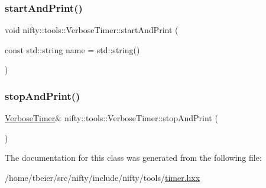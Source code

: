 \subsubsection{\texorpdfstring{start\+And\+Print()}{startAndPrint()}}
{\footnotesize\ttfamily void nifty\+::tools\+::\+Verbose\+Timer\+::start\+And\+Print (\begin{DoxyParamCaption}\item[{const std\+::string}]{name = {\ttfamily std\+:\+:string()} }\end{DoxyParamCaption})\hspace{0.3cm}{\ttfamily [inline]}}

\mbox{\label{classnifty_1_1tools_1_1VerboseTimer_a6a56ecb0e21a8407b14620fd91a2d492}} 
\subsubsection{\texorpdfstring{stop\+And\+Print()}{stopAndPrint()}}
{\footnotesize\ttfamily \hyperlink{classnifty_1_1tools_1_1VerboseTimer}{Verbose\+Timer}\& nifty\+::tools\+::\+Verbose\+Timer\+::stop\+And\+Print (\begin{DoxyParamCaption}{ }\end{DoxyParamCaption})\hspace{0.3cm}{\ttfamily [inline]}}



The documentation for this class was generated from the following file\+:\begin{DoxyCompactItemize}
\item 
/home/tbeier/src/nifty/include/nifty/tools/\hyperlink{timer_8hxx}{timer.\+hxx}\end{DoxyCompactItemize}

